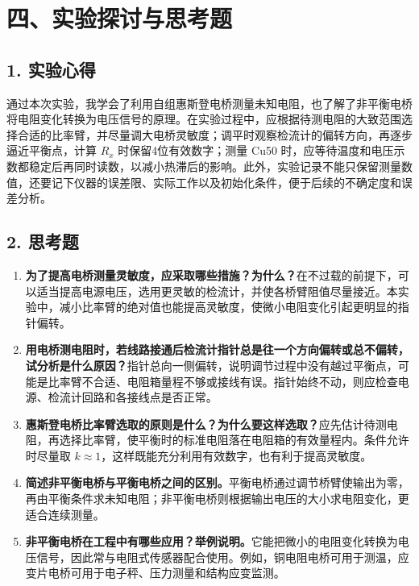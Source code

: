\section*{四、实验探讨与思考题}

\subsection*{1. 实验心得}

通过本次实验，我学会了利用自组惠斯登电桥测量未知电阻，也了解了非平衡电桥将电阻变化转换为电压信号的原理。在实验过程中，应根据待测电阻的大致范围选择合适的比率臂，并尽量调大电桥灵敏度；调平时观察检流计的偏转方向，再逐步逼近平衡点，计算 $R_x$ 时保留4位有效数字；测量 Cu50 时，应等待温度和电压示数都稳定后再同时读数，以减小热滞后的影响。此外，实验记录不能只保留测量数值，还要记下仪器的误差限、实际工作以及初始化条件，便于后续的不确定度和误差分析。

\begingroup
{}
\subsection*{2. 思考题}

\begin{enumerate}
  \item \textbf{为了提高电桥测量灵敏度，应采取哪些措施？为什么？}在不过载的前提下，可以适当提高电源电压，选用更灵敏的检流计，并使各桥臂阻值尽量接近。本实验中，减小比率臂的绝对值也能提高灵敏度，使微小电阻变化引起更明显的指针偏转。

  \item \textbf{用电桥测电阻时，若线路接通后检流计指针总是往一个方向偏转或总不偏转，试分析是什么原因？}指针总向一侧偏转，说明调节过程中没有越过平衡点，可能是比率臂不合适、电阻箱量程不够或接线有误。指针始终不动，则应检查电源、检流计回路和各接线点是否正常。

  \item \textbf{惠斯登电桥比率臂选取的原则是什么？为什么要这样选取？}应先估计待测电阻，再选择比率臂，使平衡时的标准电阻落在电阻箱的有效量程内。条件允许时尽量取 $k\approx1$，这样既能充分利用有效数字，也有利于提高灵敏度。

  \item \textbf{简述非平衡电桥与平衡电桥之间的区别。}平衡电桥通过调节桥臂使输出为零，再由平衡条件求未知电阻；非平衡电桥则根据输出电压的大小求电阻变化，更适合连续测量。

  \item \textbf{非平衡电桥在工程中有哪些应用？举例说明。}它能把微小的电阻变化转换为电压信号，因此常与电阻式传感器配合使用。例如，铜电阻电桥可用于测温，应变片电桥可用于电子秤、压力测量和结构应变监测。
\end{enumerate}
\endgroup
